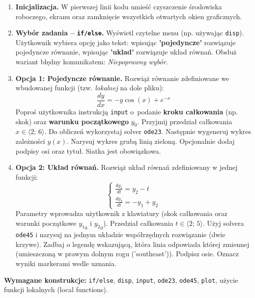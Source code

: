 \documentclass[a4paper,11pt]{article}
\begin{document}
\begin{enumerate}[leftmargin=*, label=\textbf{\arabic*.}, itemsep=2pt]

  \item \textbf{Inicjalizacja.}
    W pierwszej linii kodu umieść czyszczenie środowiska roboczego, ekranu oraz zamknięcie wszystkich otwartych okien graficznych.

  \item \textbf{Wybór zadania -- \texttt{if/else}.}
    Wyświetl czytelne menu (np. używając \texttt{disp}). Użytkownik wybiera opcję jako tekst: wpisując \textbf{'pojedyncze'} rozwiązuje pojedyncze równanie, wpisując \textbf{'uklad'} rozwiązuje układ równań. Obsłuż wariant błędny komunikatem: \textit{Niepoprawny wybór}.

  \item \textbf{Opcja 1: Pojedyncze równanie.}
    Rozwiąż równanie zdefiniowane we wbudowanej funkcji (tzw. \textit{lokalnej} na dole pliku):
    \[ \frac{dy}{dx} = -y\cos(x) + e^{-x} \]
    Poproś użytkownika instrukcją \texttt{input} o~podanie \textbf{kroku całkowania} (np. skok) oraz \textbf{warunku początkowego} $y_0$. Przyjmij przedział całkowania $x \in \langle 2;\,6 \rangle$.
    Do obliczeń wykorzystaj solver \texttt{ode23}. Następnie wygeneruj wykres zależności $y(x)$. Narysuj wykres grubą linią zieloną. Opcjonalnie dodaj podpisy osi oraz tytuł. Siatka jest obowiązkowa.

  \item \textbf{Opcja 2: Układ równań.}
    Rozwiąż układ równań zdefiniowany w jednej funkcji:\\[-0.5em]
    \[
    \begin{cases}
      \frac{dy_1}{dt} = y_2 - t \\
      \frac{dy_2}{dt} = -y_1 + y_2
    \end{cases}
    \]
    Parametry wprowadza użytkownik z klawiatury (skok całkowania oraz warunki początkowe $ {y_1}_{0} $ i $ {y_2}_{0} $). Przedział całkowania $t \in \langle 2;\,5 \rangle$.
    Użyj solvera \texttt{ode45} i narysuj na jednym układzie współrzędnych rozwiązanie (dwie krzywe). Zadbaj o legendę wskazującą, która linia odpowiada której zmiennej (umieszczoną w prawym dolnym rogu ('southeast')). Podpisz osie. Oznacz wyniki markerami wedle uznania.

\end{enumerate}

\vspace{0.3cm}
\begin{ramka}
\textbf{Wymagane konstrukcje:}
\texttt{if/else}, \texttt{disp}, \texttt{input}, \texttt{ode23}, \texttt{ode45}, \texttt{plot}, użycie funkcji lokalnych (local functions).
\end{ramka}
\end{document}
